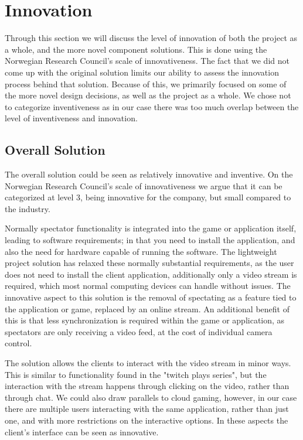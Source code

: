 \section{Innovation}

Through this section we will discuss the level of innovation of both the project as a whole, and the more novel component solutions. This is done using the Norwegian Research Council's scale of innovativeness\cite{nrcs}.
The fact that we did not come up with the original solution limits our ability to assess the innovation process behind that solution. Because of this, we primarily focused on some of the more novel design decisions, as well as the project as a whole. We chose not to categorize inventiveness as in our case there was too much overlap between the level of inventiveness and innovation.



\subsection{Overall Solution}
The overall solution could be seen as relatively innovative and inventive. On the Norwegian Research Council's\cite{nrcs} scale of innovativeness we argue that it can be categorized at level 3, being innovative for the company, but small compared to the industry.

Normally spectator functionality is integrated into the game or application itself, leading to software requirements; in that you need to install the application, and also the need for hardware capable of running the software. The lightweight project solution has relaxed these normally substantial requirements, as the user does not need to install the client application, additionally only a video stream is required, which most normal computing devices can handle without issues. The innovative aspect to this solution is the removal of spectating as a feature tied to the application or game, replaced by an online stream. An additional benefit of this is that less synchronization is required within the game or application, as spectators are only receiving a video feed, at the cost of individual camera control.

The solution allows the clients to interact with the video stream in minor ways. This is similar to functionality found in the "twitch plays series"\cite{twitch_plays}, but the interaction with the stream happens through clicking on the video, rather than through chat. We could also draw parallels to cloud gaming, however, in our case there are multiple users interacting with the same application, rather than just one, and with more restrictions on the interactive options. In these aspects the client's interface can be seen as innovative.


